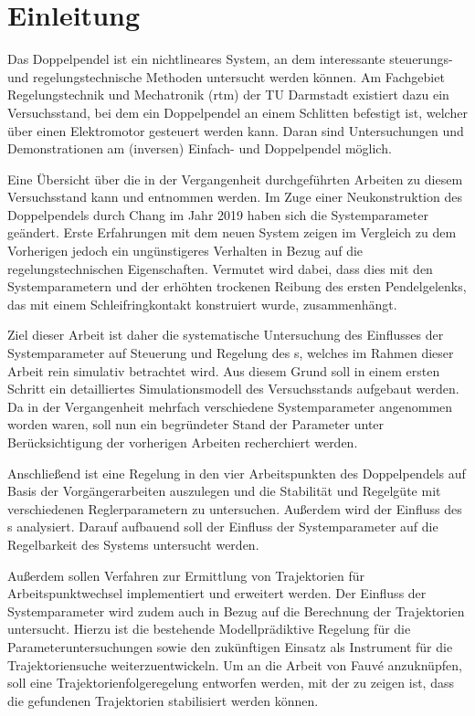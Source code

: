 \chapter{Einleitung}\label{cha:intro}

Das Doppelpendel ist ein nichtlineares System, an dem interessante steuerungs- und regelungstechnische Methoden untersucht werden können. 
Am Fachgebiet Regelungstechnik und Mechatronik (rtm) der TU Darmstadt existiert dazu ein Versuchsstand, bei dem ein Doppelpendel an einem Schlitten befestigt ist, welcher über einen Elektromotor gesteuert werden kann.
Daran sind Untersuchungen und Demonstrationen am (inversen) Einfach- und Doppelpendel möglich. 

Eine Übersicht über die in der Vergangenheit durchgeführten Arbeiten zu diesem Versuchsstand kann \cite{chang} und \cite{ribeiro} entnommen werden. Im Zuge einer Neukonstruktion des Doppelpendels durch Chang \cite{chang} im Jahr 2019 haben sich die Systemparameter geändert. Erste Erfahrungen mit dem neuen System zeigen im Vergleich zu dem Vorherigen jedoch ein ungünstigeres Verhalten in Bezug auf die regelungstechnischen Eigenschaften. 
Vermutet wird dabei, dass dies mit den Systemparametern und der erhöhten trockenen Reibung des ersten Pendelgelenks, das mit einem Schleifringkontakt konstruiert wurde, zusammenhängt. 

Ziel dieser Arbeit ist daher die systematische Untersuchung des Einflusses der Systemparameter auf Steuerung und Regelung des \spds s, welches im Rahmen dieser Arbeit rein simulativ betrachtet wird. Aus diesem Grund soll in einem ersten Schritt ein detailliertes Simulationsmodell des Versuchsstands aufgebaut werden. 
Da in der Vergangenheit mehrfach verschiedene Systemparameter angenommen worden waren, soll nun ein begründeter Stand der Parameter unter Berücksichtigung der vorherigen Arbeiten recherchiert werden. 

Anschließend ist eine Regelung in den vier Arbeitspunkten des Doppelpendels auf Basis der Vorgängerarbeiten auszulegen und die Stabilität und Regelgüte mit verschiedenen Reglerparametern zu untersuchen. 
Außerdem wird der Einfluss des \beob s analysiert.
Darauf aufbauend soll der Einfluss der Systemparameter auf die Regelbarkeit des Systems untersucht werden.

Außerdem sollen Verfahren zur Ermittlung von Trajektorien für Arbeitspunktwechsel implementiert und erweitert werden.
Der Einfluss der Systemparameter wird zudem auch in Bezug auf die Berechnung der Trajektorien untersucht. %
Hierzu ist die bestehende Modellprädiktive Regelung für die Parameteruntersuchungen sowie den zukünftigen Einsatz als Instrument für die Trajektoriensuche weiterzuentwickeln. 
Um an die Arbeit von Fauvé \cite{fauve} anzuknüpfen, soll eine Trajektorienfolgeregelung entworfen werden, mit der zu zeigen ist, dass die gefundenen Trajektorien stabilisiert werden können. 

